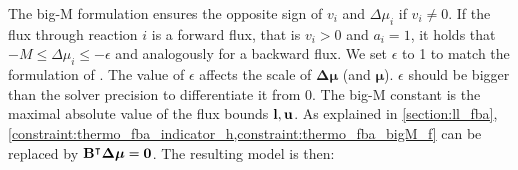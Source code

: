 The big-M formulation ensures the opposite sign of $v_i$ and $\Delta \mu_i$ if $v_i \neq 0$. If the flux through reaction $i$ is a forward flux, that is $v_i > 0$ and $a_i=1$, it holds that $-M \leq \Delta \mu_i \leq -\epsilon$ and analogously for a backward flux. We set $\epsilon$ to 1 to match the formulation of \cite{elimination_infeasible_loops}. The value of $\epsilon$ affects the scale of $\boldsymbol{\Delta \mu}$ (and $\boldsymbol \mu$). $\epsilon$ should be bigger than the solver precision to differentiate it from 0. The big-M constant is the maximal absolute value of the flux bounds $\bold l, \bold u$. 
As explained in \cref{section:ll_fba}, \cref{constraint:thermo_fba_indicator_h,constraint:thermo_fba_bigM_f} can be replaced by $\bold B^\intercal \boldsymbol{\Delta \mu} = \bold 0$. 
\newpage The resulting model is then: 

\vspace*{-\baselineskip}
